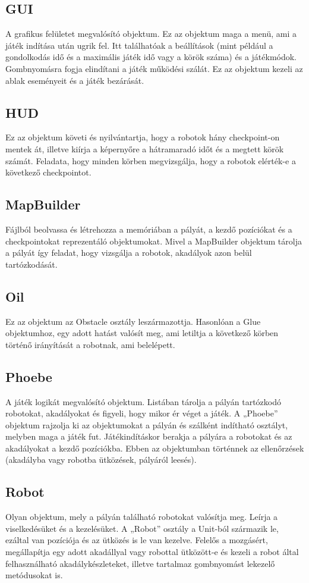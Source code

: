 \subsection{GUI}
A grafikus felületet megvalósító objektum. Ez az objektum maga a menü, ami a játék indítása után ugrik fel. Itt találhatóak a beállítások (mint például a gondolkodás idő és a maximális játék idő vagy a körök száma) és a játékmódok. Gombnyomásra fogja elindítani a játék működési szálát. Ez az objektum kezeli az ablak eseményeit és a játék bezárását.
\subsection{HUD}
Ez az objektum követi és nyilvántartja, hogy a robotok hány checkpoint-on mentek át, illetve kiírja a képernyőre a hátramaradó időt és a megtett körök számát. Feladata, hogy minden körben megvizsgálja, hogy a robotok elérték-e a következő checkpointot.
\subsection{MapBuilder}
Fájlból beolvassa és létrehozza a memóriában a pályát, a kezdő pozíciókat és a checkpointokat reprezentáló objektumokat.  Mivel a  MapBuilder objektum tárolja a pályát így feladat, hogy vizsgálja a robotok, akadályok azon belül tartózkodását.  
\subsection{Oil}
Ez az objektum az Obstacle osztály leszármazottja. Hasonlóan a Glue objektumhoz, egy adott hatást valósít meg, ami letiltja a következő körben történő irányítását a robotnak, ami belelépett.
\subsection{Phoebe}
A játék logikát megvalósító objektum. Listában tárolja a pályán tartózkodó robotokat, akadályokat és figyeli, hogy mikor ér véget a játék. A „Phoebe” objektum rajzolja ki az objektumokat a pályán és szálként indítható osztályt, melyben maga a játék fut. Játékindításkor berakja a pályára a robotokat és az akadályokat a kezdő pozíciókba. Ebben az objektumban történnek az ellenőrzések (akadályba vagy robotba ütközések, pályáról leesés).
\subsection{Robot}
Olyan objektum, mely a pályán található robotokat valósítja meg. Leírja a viselkedésüket és a kezelésüket. A „Robot” osztály a Unit-ból származik le, ezáltal van pozíciója és az ütközés is le van kezelve. Felelős a mozgásért, megállapítja egy adott akadállyal vagy robottal ütközött-e és kezeli a robot által felhasználható akadálykészleteket, illetve tartalmaz gombnyomást lekezelő metódusokat is.
